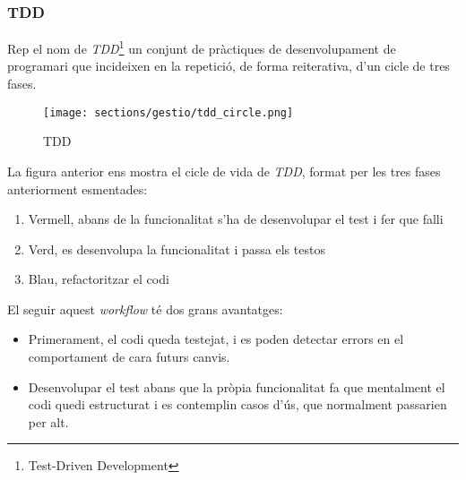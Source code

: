 \subsubsection{TDD}
\label{metodologia:tdd}
Rep el nom de \textit{TDD}\footnote{Test-Driven Development} un conjunt de pràctiques de desenvolupament de programari que incideixen en la repetició, de forma reiterativa, d'un cicle de tres fases.
\begin{figure}[h]
\texttt{[image: sections/gestio/tdd\_circle.png]}
\centering
\caption{TDD}
\label{fig:tdd}
\end{figure}
\newline La figura anterior ens mostra el cicle de vida de \textit{TDD}, format per les tres fases anteriorment esmentades:
\begin{enumerate}
    \item Vermell, abans de la funcionalitat s'ha de desenvolupar el test i fer que falli
    \item Verd, es desenvolupa la funcionalitat i passa els testos
    \item Blau, refactoritzar el codi
\end{enumerate}
El seguir aquest \textit{workflow} té dos grans avantatges:
\begin{itemize}
    \item Primerament, el codi queda testejat, i es poden detectar errors en el comportament de cara  futurs canvis.
    \item Desenvolupar el test abans que la pròpia funcionalitat fa que mentalment el codi quedi estructurat i es contemplin casos d'ús, que normalment passarien per alt.
\end{itemize}